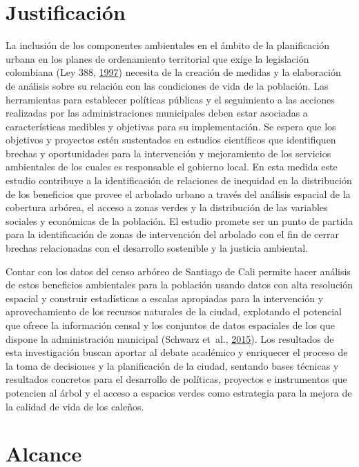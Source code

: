 \documentclass[12pt,a4paper,openany]{book}
\theoremstyle{definition}
\theoremstyle{definition}
\theoremstyle{definition}
\theoremstyle{remark}
\begin{document}
\section{Justificación}\label{justificaciuxf3n}

La inclusión de los componentes ambientales en el ámbito de la
planificación urbana en los planes de ordenamiento territorial que exige
la legislación colombiana (Ley 388,
\protect\hyperlink{ref-ley388col}{1997}) necesita de la creación de
medidas y la elaboración de análisis sobre su relación con las
condiciones de vida de la población. Las herramientas para establecer
políticas públicas y el seguimiento a las acciones realizadas por las
administraciones municipales deben estar asociadas a características
medibles y objetivas para su implementación. Se espera que los objetivos
y proyectos estén sustentados en estudios científicos que identifiquen
brechas y oportunidades para la intervención y mejoramiento de los
servicios ambientales de los cuales es responsable el gobierno local. En
esta medida este estudio contribuye a la identificación de relaciones de
inequidad en la distribución de los beneficios que provee el arbolado
urbano a través del análisis espacial de la cobertura arbórea, el acceso
a zonas verdes y la distribución de las variables sociales y económicas
de la población. El estudio promete ser un punto de partida para la
identificación de zonas de intervención del arbolado con el fin de
cerrar brechas relacionadas con el desarrollo sostenible y la justicia
ambiental.

Contar con los datos del censo arbóreo de Santiago de Cali permite hacer
análisis de estos beneficios ambientales para la población usando datos
con alta resolución espacial y construir estadísticas a escalas
apropiadas para la intervención y aprovechamiento de los recursos
naturales de la ciudad, explotando el potencial que ofrece la
información censal y los conjuntos de datos espaciales de los que
dispone la administración municipal (Schwarz et~al.,
\protect\hyperlink{ref-schwarz_trees_2015}{2015}). Los resultados de
esta investigación buscan aportar al debate académico y enriquecer el
proceso de la toma de decisiones y la planificación de la ciudad,
sentando bases técnicas y resultados concretos para el desarrollo de
políticas, proyectos e instrumentos que potencien al árbol y el acceso a
espacios verdes como estrategia para la mejora de la calidad de vida de
los caleños.

\section{Alcance}\label{alcance}
\end{document}
